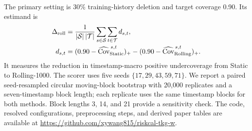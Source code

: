 The primary setting is 30\% training-history deletion and target coverage 0.90.
Its estimand is
\[
\begin{aligned}
  \Delta_{\mathrm{roll}}
  &=\frac{1}{|\mathcal{S}|\,|\mathcal{T}|}
    \sum_{s\in\mathcal{S}}\sum_{t\in\mathcal{T}} d_{s,t},\\
  d_{s,t}
  &=(0.90-\widehat{\operatorname{Cov}}^{\,s,t}_{\mathrm{Static}})_+
   -(0.90-\widehat{\operatorname{Cov}}^{\,s,t}_{\mathrm{Rolling}})_+ .
\end{aligned}
\]
It measures the reduction in timestamp-macro positive undercoverage from
Static to Rolling-1000. The scorer uses five seeds
\(\{17,29,43,59,71\}\). We report a paired seed-resampled circular
moving-block bootstrap with 20,000 replicates and a seven-timestamp block
length; each replicate uses the same timestamp blocks for both methods. Block
lengths 3, 14, and 21 provide a sensitivity check. The code, resolved
configurations, preprocessing steps, and derived paper tables are available at
\url{https://github.com/xywang815/riskcal-tkg-w}.

